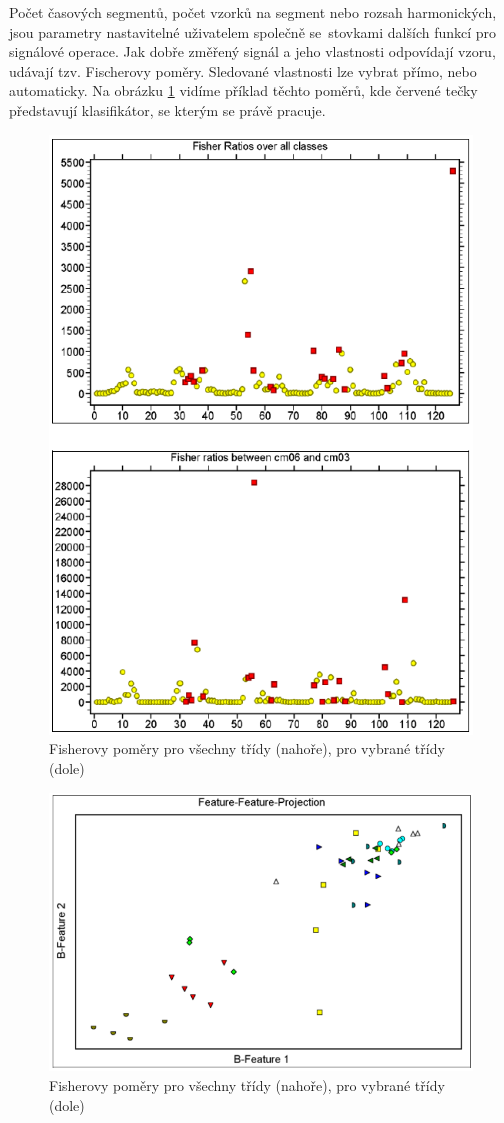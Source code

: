 Počet časových segmentů, počet 
vzorků na segment nebo rozsah harmonických,
jsou parametry nastavitelné uživatelem společně 
se~stovkami dalších funkcí pro signálové operace.
Jak dobře změřený signál a jeho vlastnosti odpovídají
vzoru, udávají tzv. Fischerovy poměry. 
Sledované vlastnosti lze vybrat přímo, nebo 
automaticky. Na obrázku \ref{fig:vallen_fisherovy_vzorce}
vidíme příklad těchto poměrů, kde červené tečky
představují klasifikátor, se kterým se právě pracuje.
\begin{figure}[!h]
    \centering
    \includegraphics[width=0.75\linewidth]{obrazky/visual_class_fisher_ratios.png}
    \caption{Fisherovy poměry pro všechny třídy (nahoře), pro vybrané třídy (dole) \cite{vallen_visual_class}}
    \label{fig:vallen_fisherovy_vzorce}
\end{figure}
\begin{figure}[!h]
    \centering
    \includegraphics[width=0.75\linewidth]{obrazky/visual_class_feature_feature.png}
    \caption{Fisherovy poměry pro všechny třídy (nahoře), pro vybrané třídy (dole) \cite{vallen_visual_class}}
    \label{fig:vallen_feature_feature}
\end{figure}
